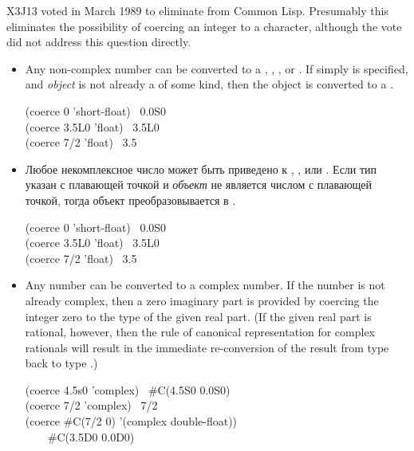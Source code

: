 \begin{defun}[Function]
\begin{newer}
X3J13 voted in March 1989 
to eliminate  from Common Lisp.
Presumably this eliminates the possibility of coercing an
integer to a character, although the vote did not address
this question directly.
\end{newer}

\begin{itemize}
\item
Any non-complex number can be converted to a ,
, , or .  If simply 
is specified, and \textit{object} is not already a  of some kind, then
the object is converted to a .
\begin{lisp}
(coerce 0 'short-float) \EV\ 0.0S0 \\
(coerce 3.5L0 'float) \EV\ 3.5L0 \\
(coerce 7/2 'float) \EV\ 3.5
\end{lisp}

\item
Любое некомплексное число может быть приведено к ,
,  или . Если тип указан с
плавающей точкой и \textit{объект} не является числом с плавающей точкой, тогда
объект преобразовывается в .

\begin{lisp}
(coerce 0 'short-float) \EV\ 0.0S0 \\
(coerce 3.5L0 'float) \EV\ 3.5L0 \\
(coerce 7/2 'float) \EV\ 3.5
\end{lisp}

\item
Any number can be converted to a complex number.
If the number is not already complex, then a zero imaginary part
is provided by coercing the integer zero to the type of the given real part.
(If the given real part is rational, however, then the rule of
canonical representation for complex rationals will result
in the immediate re-conversion of the result from type 
back to type .)

\begin{lisp}
(coerce 4.5s0 'complex) \EV\ \#C(4.5S0 0.0S0) \\
(coerce 7/2 'complex) \EV\ 7/2 \\
(coerce \#C(7/2 0) '(complex double-float)) \\
~~~\EV\ \#C(3.5D0 0.0D0)
\end{lisp}


\end{itemize}
\end{defun}
